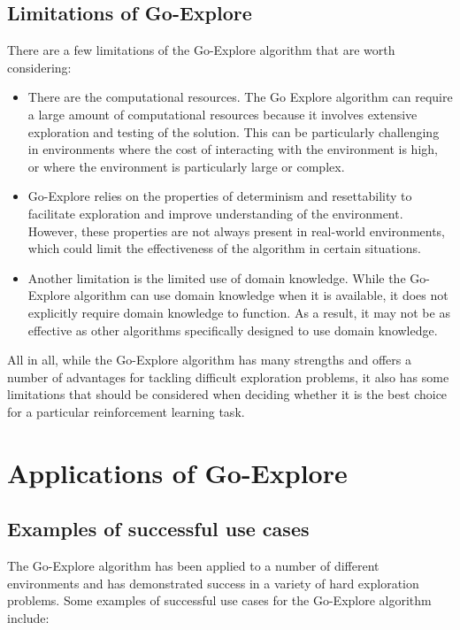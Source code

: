 \documentclass[runningheads]{llncs}%
\begin{document}
\subsection{Limitations of Go-Explore}
There are a few limitations of the Go-Explore algorithm that are worth considering:
\begin{itemize}
\item There are the computational resources. The Go Explore algorithm can require a large amount of computational resources because it involves extensive exploration and testing of the solution. This can be particularly challenging in environments where the cost of interacting with the environment is high, or where the environment is particularly large or complex.

\item Go-Explore relies on the properties of determinism and resettability to facilitate exploration and improve understanding of the environment. However, these properties are not always present in real-world environments, which could limit the effectiveness of the algorithm in certain situations.

\item Another limitation is the limited use of domain knowledge. While the Go-Explore algorithm can use domain knowledge when it is available, it does not explicitly require domain knowledge to function. As a result, it may not be as effective as other algorithms specifically designed to use domain knowledge.
\end{itemize}

All in all, while the Go-Explore algorithm has many strengths and offers a number of advantages for tackling difficult exploration problems, it also has some limitations that should be considered when deciding whether it is the best choice for a particular reinforcement learning task.

\section{Applications of Go-Explore}

\subsection{Examples of successful use cases}

The Go-Explore algorithm has been applied to a number of different environments and has demonstrated success in a variety of hard exploration problems. Some examples of successful use cases for the Go-Explore algorithm include:
\end{document}
